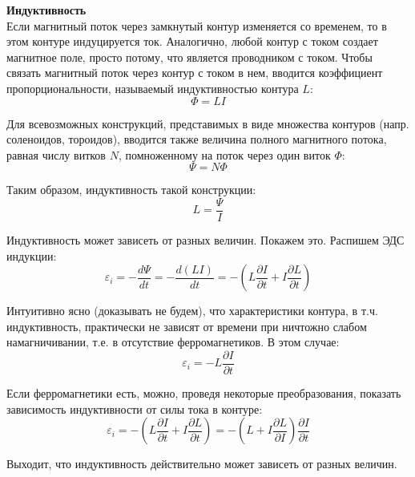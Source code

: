 \documentclass{article}
\begin{document}
	
	\textbf{Индуктивность}\\

	Если магнитный поток через замкнутый контур изменяется со временем, то в этом контуре индуцируется ток. Аналогично, любой контур с током создает магнитное поле, просто потому, что является проводником с током. Чтобы связать магнитный поток через контур с током в нем, вводится коэффициент пропорциональности, называемый индуктивностью контура $L$:
	\begin{equation}
		\Phi = LI
	\end{equation}

	Для всевозможных конструкций, представимых в виде множества контуров (напр. соленоидов, тороидов), вводится также величина полного магнитного потока, равная числу витков $N$, помноженному на поток через один виток $\Phi$:
	\begin{equation}
		\Psi = N\Phi
	\end{equation}

	Таким образом, индуктивность такой конструкции:
	\begin{equation}
		L = \frac{\Psi}{I}
	\end{equation}

	Индуктивность может зависеть от разных величин. Покажем это. Распишем ЭДС индукции:
	\begin{equation}
		\varepsilon_i=-\frac{d\Psi}{dt}=-\frac{d(LI)}{dt}=-(L\frac{\partial I}{\partial t}+I\frac{\partial L}{\partial t})
	\end{equation}

	Интуитивно ясно (доказывать не будем), что характеристики контура, в т.ч. индуктивность, практически не зависят от времени при ничтожно слабом намагничивании, т.е. в отсутствие ферромагнетиков. В этом случае:
	\begin{equation}
		\varepsilon_i=-L\frac{\partial I}{\partial t}
	\end{equation}

	Если ферромагнетики есть, можно, проведя некоторые преобразования, показать зависимость индуктивности от силы тока в контуре:
	\begin{equation}
		\varepsilon_i=-(L\frac{\partial I}{\partial t}+I\frac{\partial L}{\partial t})=-(L+I\frac{\partial L}{\partial I})\frac{\partial I}{\partial t}
	\end{equation}

	Выходит, что индуктивность действительно может зависеть от разных величин.
\end{document}
